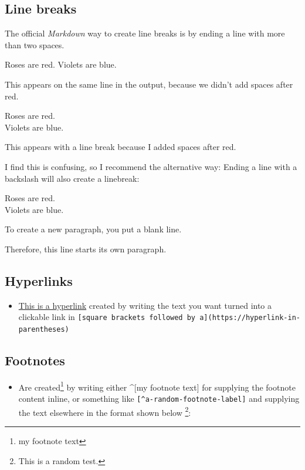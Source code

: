 \documentclass[a4paper, twoside]{templates/ociamthesis}
\providecommand{\tightlist}{%
  \setlength{\itemsep}{0pt}\setlength{\parskip}{0pt}}
\theoremstyle{definition}
\theoremstyle{definition}
\theoremstyle{definition}
\theoremstyle{definition}
\theoremstyle{remark}
\begin{document}
\hypertarget{line-breaks}{%
\subsection{Line breaks}\label{line-breaks}}

The official \emph{Markdown} way to create line breaks is by ending a line with more than two spaces.

Roses are red.
Violets are blue.

This appears on the same line in the output, because we didn't add spaces after red.

Roses are red.\\
Violets are blue.

This appears with a line break because I added spaces after red.

I find this is confusing, so I recommend the alternative way: Ending a line with a backslash will also create a linebreak:

Roses are red.\\
Violets are blue.

To create a new paragraph, you put a blank line.

Therefore, this line starts its own paragraph.

\hypertarget{hyperlinks}{%
\subsection{Hyperlinks}\label{hyperlinks}}

\begin{itemize}
\tightlist
\item
  \href{https://www.google.com}{This is a hyperlink} created by writing the text you want turned into a clickable link in \texttt{{[}square\ brackets\ followed\ by\ a{]}(https://hyperlink-in-parentheses)}
\end{itemize}

\hypertarget{footnotes}{%
\subsection{Footnotes}\label{footnotes}}

\begin{itemize}
\tightlist
\item
  Are created\footnote{my footnote text} by writing either \^{}{[}my footnote text{]} for supplying the footnote content inline, or something like \texttt{{[}\^{}a-random-footnote-label{]}} and supplying the text elsewhere in the format shown below \footnote{This is a random test.}:
\end{itemize}
\end{document}
